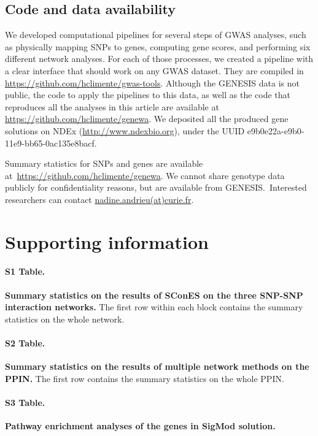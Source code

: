 \documentclass[10pt,letterpaper]{article}
\begin{document}
\subsection{Code and data availability}
\label{methods:code}

We developed computational pipelines for several steps of GWAS analyses, such as physically mapping SNPs to genes, computing gene scores, and performing six different network analyses. For each of those processes, we created a pipeline with a clear interface that should work on any GWAS dataset. They are compiled in \url{https://github.com/hclimente/gwas-tools}. Although the GENESIS data is not public, the code to apply the pipelines to this data, as well as the code that reproduces all the analyses in this article are available at \url{https://github.com/hclimente/genewa}. We deposited all the produced gene solutions on NDEx (\url{http://www.ndexbio.org}), under the UUID e9b0e22a-e9b0-11e9-bb65-0ac135e8bacf.

Summary statistics for SNPs and genes are available at \url{https://github.com/hclimente/genewa}. We cannot share genotype data publicly for confidentiality reasons, but are available from GENESIS. Interested researchers can contact \href{mailto:nadine.andrieu@curie.fr}{nadine.andrieu(at)curie.fr}.

\section{Supporting information}

\paragraph*{S1 Table.}
\label{stab:snp_solutions}
{\bf Summary statistics on the results of SConES on the three SNP-SNP interaction networks.} The first row within each block contains the summary statistics on the whole network.

\paragraph*{S2 Table.}
\label{stab:scones_gene_solutions}
{\bf Summary statistics on the results of multiple network methods on the PPIN.} The first row contains the summary statistics on the whole PPIN.

\paragraph*{S3 Table.}
\label{stab:sigmod_pwy}
{\bf Pathway enrichment analyses of the genes in SigMod solution.}
\end{document}
